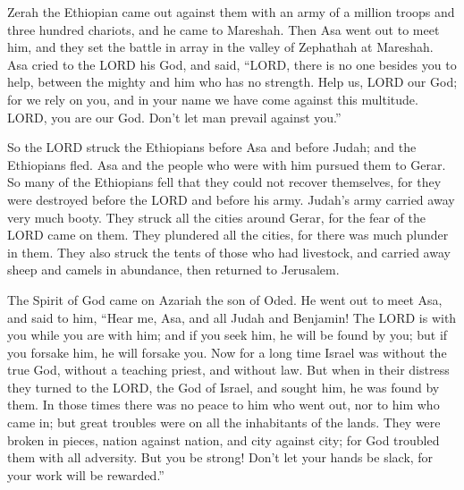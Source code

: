 \myverse{}Zerah the Ethiopian came out against them with an army of a million
troops and three hundred chariots, and he came to Mareshah.
\myverse{}Then Asa went out to meet him, and they set the battle in array in the valley
of Zephathah at Mareshah.
\myverse{}Asa cried to the LORD his God, and said, “LORD, there is no one besides you
to help, between the mighty and him who has no strength. Help us, LORD our God; for we rely on you, and
in your name we have come against this multitude. LORD, you are our God. Don’t let man prevail against
you.”

\myverse{}So the LORD struck the Ethiopians before Asa and before Judah;
and the Ethiopians fled.
\myverse{}Asa and the people who were with him pursued them to Gerar. So many of the
Ethiopians fell that they could not recover themselves, for they were destroyed before the LORD and before
his army. Judah’s army carried away very much booty.
\myverse{}They struck all the cities around Gerar, for the fear of the LORD came on
them. They plundered all the cities, for there was much plunder in them.
\myverse{}They also struck the tents of those who had livestock, and carried away sheep
and camels in abundance, then returned to Jerusalem.


\mychapter{} \myverse*{}The Spirit of God came on Azariah the son of Oded.
\myverse{}He went out to meet Asa, and said to him, “Hear me, Asa, and all Judah and
Benjamin! The LORD is with you while you are with him; and if you seek him, he will be found by you; but
if you forsake him, he will forsake you.
\myverse{}Now for a long time Israel was without the true God, without a teaching priest,
and without law.
\myverse{}But when in their distress they turned to the LORD, the God of Israel, and
sought him, he was found by them.
\myverse{}In those times there was no peace to him who went out, nor to him who came
in; but great troubles were on all the inhabitants of the lands.
\myverse{}They were broken in pieces, nation against nation, and city against city; for
God troubled them with all adversity.
\myverse{}But you be strong! Don’t let your hands be slack, for your work will be rewarded.”

